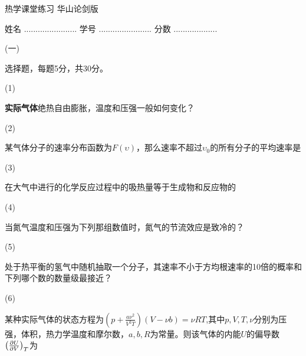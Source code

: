 \documentclass[10pt,CJK]{article}
\begin{document}
\bch
{\large 热学课堂练习 华山论剑版}

{\vskip 0.05in}

姓名 ....................... {\hskip 0.5in}    学号 .......................{\hskip 0.5in}  分数 ...................

\bitem

\item[(一)]{选择题，每题5分，共30分。

  \bitem


\item[(1)]{{\bf 实际气体}绝热自由膨胀，温度和压强一般如何变化？ \bropt
  

}

  
\item[(2)]{某气体分子的速率分布函数为$F(\upsilon)$，那么速率不超过$\upsilon_0$的所有分子的平均速率是
  \bropt

}
  

  \item[(3)]{
  在大气中进行的化学反应过程中的吸热量等于生成物和反应物的 \bropt


  }

\item[(4)]{当氮气温度和压强为下列那组数值时，氮气的节流效应是致冷的？ \bropt
  

}
    

\item[(5)]{
  处于热平衡的氢气中随机抽取一个分子，其速率不小于方均根速率的10倍的概率和下列哪个数的数量级最接近？\bropt

}

\item[(6)]{某种实际气体的状态方程为$\left(p+\frac{a\nu^2}{V^2T}\right)(V-\nu b) = \nu R T$,其中$p, V, T, \nu$分别为压强，体积，热力学温度和摩尔数，$a, b, R$为常量。则该气体的内能$U$的偏导数$\left(\frac{\partial U}{\partial V}\right)_{T}$为 \bropt

  }
  
  \eitem
}
\end{document}
